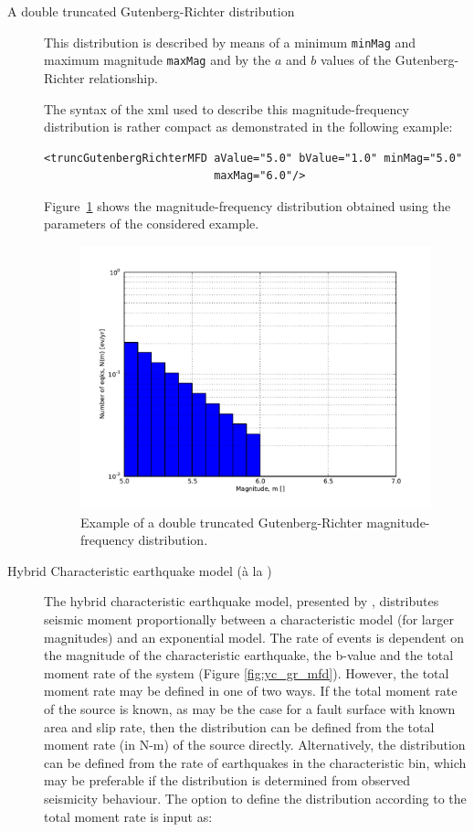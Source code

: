 \begin{description}
\item[A double truncated Gutenberg-Richter distribution]

This distribution is described by means of a minimum \texttt{minMag} and
maximum magnitude \texttt{maxMag} and by the $a$ and $b$ values of the
Gutenberg-Richter relationship.

The syntax of the xml used to describe this magnitude-frequency distribution is rather compact as demonstrated in the following example:

\begin{verbatim}
<truncGutenbergRichterMFD aValue="5.0" bValue="1.0" minMag="5.0"
                          maxMag="6.0"/>
\end{verbatim}

Figure~\ref{fig:dt_gr_mfd} shows the magnitude-frequency distribution
obtained using the parameters of the considered example.

\begin{figure}[!ht]
\centering
\includegraphics[width=12cm]{figures/hazard/dt_mfd.pdf}
\caption{Example of a double truncated Gutenberg-Richter magnitude-frequency
distribution.}
\label{fig:dt_gr_mfd}
\end{figure}

\item[Hybrid Characteristic earthquake model (\`{a} la \cite{youngs1985})]
The hybrid characteristic earthquake model, presented by \cite{youngs1985}, distributes seismic moment proportionally between a characteristic model (for larger magnitudes) and an exponential model. The rate of events is dependent on the magnitude of the characteristic earthquake, the b-value and the total moment rate of the system (Figure \ref{fig:yc_gr_mfd}). However, the total moment rate may be defined in one of two ways. If the total moment rate of the source is known, as may be the case for a fault surface with known area and slip rate, then the distribution can be defined from the total moment rate (in N-m) of the source directly. Alternatively, the distribution can be defined from the rate of earthquakes in the characteristic bin, which may be preferable if the distribution is determined from observed seismicity behaviour. The option to define the distribution according to the total moment rate is input as:



\end{description}
